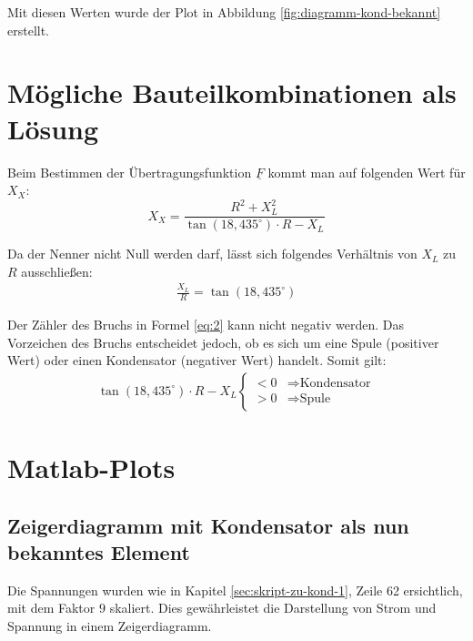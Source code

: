 \documentclass[11pt]{scrartcl}
\begin{document}
Mit diesen Werten wurde der Plot in Abbildung \ref{fig:diagramm-kond-bekannt} erstellt.

\newpage
\section{Mögliche Bauteilkombinationen als Lösung}
Beim Bestimmen der Übertragungsfunktion $\underline{F}$ kommt man auf folgenden Wert für $X_{X}$:
\begin{equation}
  \label{eq:2}
  X_{X} = \frac{R^{2} + X_{L}^{2}}{\tan(18,435^{\circ})\cdot R -X_{L}}
\end{equation}

Da der Nenner nicht Null werden darf, lässt sich folgendes Verhältnis von $X_{L}$ zu $R$ ausschließen:
\begin{align*}
  \frac{X_{L}}{R} = \tan(18,435^{\circ})
\end{align*}

Der Zähler des Bruchs in Formel \ref{eq:2} kann nicht negativ werden. Das Vorzeichen des Bruchs entscheidet jedoch, ob es sich um eine Spule (positiver Wert) oder einen Kondensator (negativer Wert) handelt. Somit gilt:
\begin{align*}
  \tan(18,435^{\circ})\cdot R -X_{L}
  \begin{cases}
    < 0 & \Longrightarrow \text{Kondensator}\\
    > 0 & \Longrightarrow \text{Spule}
  \end{cases}
\end{align*}

\newpage
\section{Matlab-Plots}
\label{sec:matlab-skripten}
\subsection{Zeigerdiagramm mit Kondensator als nun bekanntes Element}
\label{sec:zeig-mit-kond-bekannt}

Die Spannungen wurden wie in Kapitel \ref{sec:skript-zu-kond-1}, Zeile 62 ersichtlich, mit dem Faktor $9$ skaliert. Dies gewährleistet die Darstellung von Strom und Spannung in einem Zeigerdiagramm.
\end{document}
